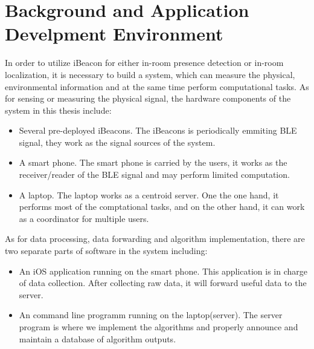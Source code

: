 \documentclass[12pt]{report}
\begin{document}

\chapter{Background and Application Develpment Environment}
In order to utilize iBeacon for either in-room presence detection or in-room localization, it is necessary to build a system, which can measure the physical, environmental information and at the same time perform computational tasks. As for sensing or measuring the physical signal, the hardware components of the system in this thesis include:

\begin{itemize}
\item Several pre-deployed iBeacons. The iBeacons is periodically emmiting BLE signal, they work as the signal sources of the system.
\item A smart phone. The smart phone is carried by the users, it works as the receiver/reader of the BLE signal and may perform limited computation.
\item A laptop. The laptop works as a centroid server. One the one hand, it performs most of the comptational tasks, and on the other hand, it can work as a coordinator for multiple users.
\end{itemize}

As for data processing, data forwarding and algorithm implementation, there are two separate parts of software in the system including:

\begin{itemize}
\item An iOS application running on the smart phone. This application is in charge of data collection. After collecting raw data, it will forward useful data to the server.
\item An command line programm running on the laptop(server). The server program is where we implement the algorithms and properly announce and maintain a database of algorithm outputs.  
\end{itemize}
\end{document}
